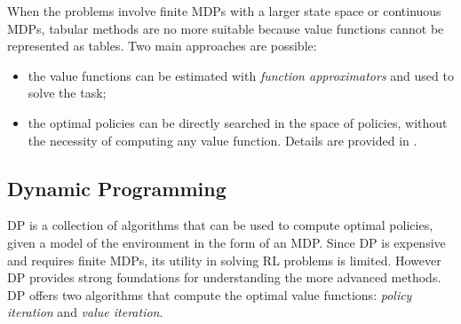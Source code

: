 \newline
When the problems involve finite \ac{MDPs} with a larger state space or continuous \ac{MDPs}, tabular methods are no more suitable because value functions cannot be represented as tables. Two main approaches are possible:
\begin{itemize}
	\item the value functions can be estimated with \emph{function approximators} and used to solve the task;
	\item the optimal policies can be directly searched in the space of policies, without the necessity of computing any value function. Details are provided in .
\end{itemize}

\subsection{Dynamic Programming}\label{subsec:dp}
\acf{DP} is a collection of algorithms that can be used to compute optimal policies, given a model of the environment in the form of an \ac{MDP}. Since \ac{DP} is expensive and requires finite \ac{MDPs}, its utility in solving \ac{RL} problems is limited. However \ac{DP} provides strong foundations for understanding the more advanced methods. \ac{DP} offers two algorithms that compute the optimal value functions: \emph{policy iteration} and \emph{value iteration}.

